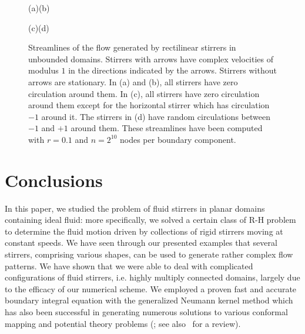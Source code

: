 \documentclass[11pt,a4paper]{article}
\begin{document}
\begin{figure}[ht] %
{\quad(a)\hfill\qquad(b)\hfill}

\centerline{
\hfill
{}
}
{\quad(c)\hfill\qquad(d)\hfill}

\centerline{
\hfill
{}
}
\caption{Streamlines of the flow generated by rectilinear stirrers in unbounded domains. Stirrers with arrows have complex velocities of modulus $1$ in the directions indicated by the arrows. Stirrers without arrows are stationary. In (a) and (b), all stirrers have zero circulation around them. In (c), all stirrers have zero circulation around them except for the horizontal stirrer which has circulation $-1$ around it. The stirrers in (d) have random circulations between $-1$ and $+1$ around them. These streamlines have been computed with $r=0.1$ and $n=2^{10}$ nodes per boundary component.} 
\label{f:Stirrers-half}
\end{figure}


\section{Conclusions}


In this paper, we studied the problem of fluid stirrers in planar
domains containing ideal fluid: more specifically, we solved a certain
class of R-H problem to determine the fluid motion driven by
collections of rigid stirrers moving at constant speeds. We have seen
through our presented examples that several stirrers, comprising
various shapes, can be used to generate rather complex flow patterns.
We have shown that we were able to deal with complicated
configurations of fluid stirrers, i.e. highly multiply connected
domains, largely due to the efficacy of our numerical scheme. We
employed a proven fast and accurate boundary integral equation 
with the generalized Neumann kernel method
which has also been successful in
generating numerous solutions to various conformal mapping and
potential theory problems (\cite{Nas-CMFT09,Nas-SIAM09,Nas-JMAA11,Nas-JMAA13,Nas-SIAM13,nas-lap}; see also~\cite{NAS-ETNA15} for a review).
\end{document}

